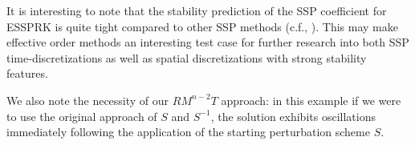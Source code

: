 It is interesting to note that the stability prediction of the SSP
coefficient for ESSPRK is quite tight compared to other SSP methods
(c.f., \cite[Table 5.1]{Ketcheson/Gottlieb/Macdonald:TSRK}).
This may make effective order methods an interesting test case for
further research into both SSP time-discretizations as well as spatial
discretizations with strong stability features.


We also note the necessity of our $RM^{n-2}T$ approach: in this
example if we were to use the original approach of $S$ and $S^{-1}$,
the solution exhibits oscillations immediately following the
application of the starting perturbation scheme $S$.



